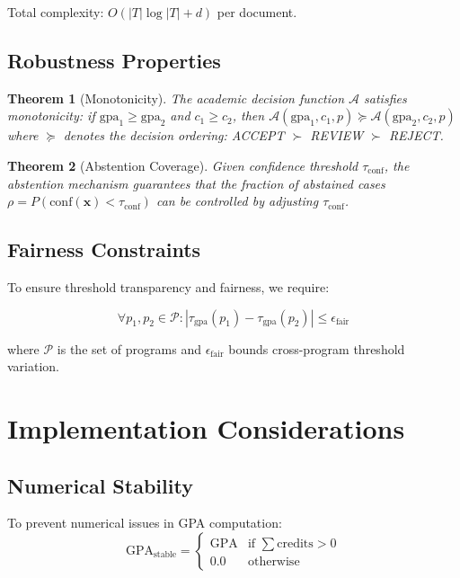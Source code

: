 \documentclass[11pt]{article}
\newtheorem{theorem}{Theorem}
\begin{document}
Total complexity: $O(|T| \log |T| + d)$ per document.

\subsection{Robustness Properties}

\begin{theorem}[Monotonicity]
The academic decision function $\mathcal{A}$ satisfies monotonicity: if $\text{gpa}_1 \geq \text{gpa}_2$ and $c_1 \geq c_2$, then $\mathcal{A}(\text{gpa}_1, c_1, p) \succeq \mathcal{A}(\text{gpa}_2, c_2, p)$ where $\succeq$ denotes the decision ordering: ACCEPT $\succ$ REVIEW $\succ$ REJECT.
\end{theorem}

\begin{theorem}[Abstention Coverage]
Given confidence threshold $\tau_{\text{conf}}$, the abstention mechanism guarantees that the fraction of abstained cases $\rho = P(\text{conf}(\mathbf{x}) < \tau_{\text{conf}})$ can be controlled by adjusting $\tau_{\text{conf}}$.
\end{theorem}

\subsection{Fairness Constraints}
To ensure threshold transparency and fairness, we require:

\begin{equation}
\forall p_1, p_2 \in \mathcal{P}: |\tau_{\text{gpa}}(p_1) - \tau_{\text{gpa}}(p_2)| \leq \epsilon_{\text{fair}}
\end{equation}

where $\mathcal{P}$ is the set of programs and $\epsilon_{\text{fair}}$ bounds cross-program threshold variation.

\section{Implementation Considerations}

\subsection{Numerical Stability}
To prevent numerical issues in GPA computation:
\begin{equation}
\text{GPA}_{\text{stable}} = \begin{cases}
\text{GPA} & \text{if } \sum \text{credits} > 0 \\
0.0 & \text{otherwise}
\end{cases}
\end{equation}
\end{document}
